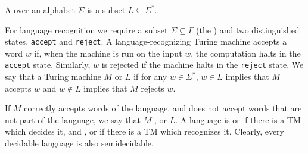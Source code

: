 
\begin{definition}
  A  over an alphabet $\Sigma$ is a subset $L \subseteq
  \Sigma^*$.
\end{definition}

For language recognition we require a subset $\Sigma \subseteq \Gamma$ (the
) and two distinguished states, \texttt{accept} and
\texttt{reject}.
A language-recognizing Turing machine accepts a word $w$ if, when the machine is
run on the input $w$, the computation halts in the \texttt{accept} state.
Similarly, $w$ is rejected if the machine halts in the \texttt{reject} state.
We say that a Turing machine $M$  or  $L$ if for
any $w \in \Sigma^*$, $w \in L$ implies that $M$ accepts $w$ and $w \notin L$
implies that $M$ rejects $w$.

If $M$ correctly accepts words of the language, and does not accept words that
are not part of the language, we say that $M$ ,
 or  $L$.
A language is  or  if there is a TM which
decides it, and ,  or
 if there is a TM which recognizes it.
Clearly, every decidable language is also semidecidable.

